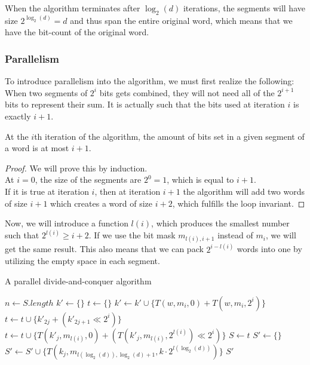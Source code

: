 When the algorithm terminates after $\log_2(d)$ iterations, the segments will have size $2^{\log_2{(d)}} = d$ and thus span the entire original word, which means that we have the bit-count of the original word. %
\subsubsection{Parallelism}
To introduce parallelism into the algorithm, we must first realize the following: When two segments of $2^i$ bits gets combined, they will not need all of the $2^{i+1}$ bits to represent their sum. It is actually such that the bits used at iteration $i$ is exactly $i+1$.
\begin{invariant}
    At the $i$th iteration of the algorithm, the amount of bits set in a given segment of a word is at most $i+1$.
\end{invariant}
\begin{proof}
    We will prove this by induction. \\
    At $i=0$, the size of the segments are $2^0 = 1$, which is equal to $i+1$.\\
    If it is true at iteration $i$, then at iteration $i+1$ the algorithm will add two words of size $i+1$ which creates a word of size $i+2$, which fulfills the loop invariant.
\end{proof}
Now, we will introduce a function $l(i)$, which produces the smallest number such that $2^{l(i)} \geq i + 2$. If we use the bit mask $m_{l(i), i+1}$ instead of $m_{i}$, we will get the same result. This also means that we can pack $2^{i-l(i)}$ words into one by utilizing the empty space in each segment.
\begin{algorithm}[H]
\caption{A parallel divide-and-conquer algorithm}\label{alg:parallel-d-and-c}
    \begin{algorithmic}
         
            \State $n \gets S.length$
                \State $k' \gets \{\}$
                \State $t \gets \{\}$
                    \State $k' \gets k' \cup \{T(w, m_i, 0) + T(w, m_i, 2^i)\}$
                \EndFor
                        \State $t \gets t \cup \{k'_{2j} + (k'_{2j+1} \ll 2^i)\}$
                    \EndFor
                \Else
                        \State $t \gets t \cup \{T(k'_{j}, m_{l(i)}, 0) + (T(k'_{j}, m_{l(i)}, 2^{l(i)}) \ll 2^{i})\}$
                    \EndFor
                \EndIf
                \State $S \gets t$
            \EndFor
            \State $S' \gets \{\}$
                \State $S' \gets S' \cup \{T(k_j, m_{l(\log_2(d)), \log_2(d) + 1}, k\cdot 2^{l(\log_2(d))})\}$
                \EndFor
            \EndFor
            \State \Return $S'$
        \EndFunction
    \end{algorithmic}
\end{algorithm}
